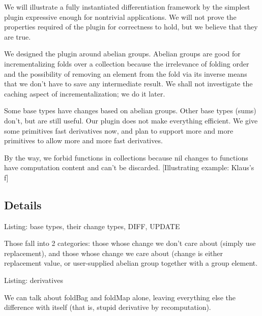 \begin{oldSec}
We will illustrate a fully instantiated differentiation framework
by the simplest plugin expressive enough for nontrivial
applications. We will not prove the properties required of the
plugin for correctness to hold, but we believe that they are
true.

We designed the plugin around abelian groups.
Abelian groups are good for incrementalizing folds over a
collection because the irrelevance of folding order and the
possibility of removing an element from the fold via its inverse
means that we don't have to save any intermediate result. We
shall not investigate the caching aspect of incrementalization;
we do it later.

Some base types have changes based on abelian groups. Other base
types (sums) don't, but are still useful. Our plugin does not
make everything efficient. We give some primitives fast
derivatives now, and plan to support more and more primitives to
allow more and more fast derivatives.

By the way, we forbid functions in collections because nil
changes to functions have computation content and can't be
discarded. [Illustrating example: Klaus's f]

\subsection*{Details}

Listing: base types, their change types, DIFF, UPDATE

Those fall into 2 categories: those whose change we don't care
about (simply use replacement), and those whose change we care
about (change is either replacement value, or user-supplied
abelian group together with a group element.

Listing: derivatives

We can talk about foldBag and foldMap alone, leaving
everything else the difference with itself (that is, stupid
derivative by recomputation).
\end{oldSec}

